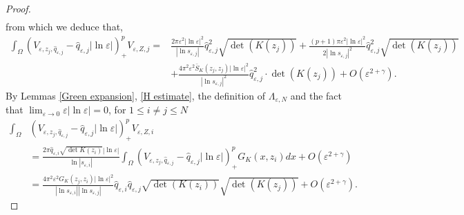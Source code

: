 \documentclass[12pt,reqno]{amsart}
\numberwithin{equation}{section}
\theoremstyle{definition}
\theoremstyle{remark}
\begin{document}
\begin{proof}
\begin{equation*}
\begin{split}
\end{split}
\end{equation*}
from which we deduce that, 
\begin{equation}\label{219}
\begin{split}
\int_{\Omega}\left (V_{\varepsilon,z_j,\hat{q}_{\varepsilon,j}}-\hat{q}_{\varepsilon,j}|\ln\varepsilon|\right )^p_+V_{\varepsilon,Z,j}
=&\frac{2\pi\varepsilon^2|\ln\varepsilon|^2}{|\ln s_{\varepsilon,j}|}\hat{q}_{\varepsilon,j}^2\sqrt{\det(K(z_j))}+\frac{(p+1)\pi\varepsilon^2|\ln\varepsilon|^2}{2 |\ln s_{\varepsilon,j}|^2}\hat{q}_{\varepsilon,j}^2\sqrt{\det(K(z_j))}\\
&+\frac{4\pi^2\varepsilon^2 \bar{S}_K(z_j,z_j)|\ln\varepsilon|^2}{|\ln s_{\varepsilon,j}|^2}\hat{q}_{\varepsilon,j}^2\cdot \det(K(z_j))+O\left( \varepsilon^{2+\gamma} \right).
\end{split}
\end{equation}
By Lemmas \ref{Green expansion}, \ref{H estimate}, the definition of $ \Lambda_{\varepsilon, N} $ and the fact that $ \lim_{\varepsilon\to 0}\varepsilon|\ln\varepsilon|=0 $, for $ 1\leq i\neq j\leq N $
\begin{equation}\label{220}
\begin{split}
\int_{\Omega}&\left (V_{\varepsilon,z_j,\hat{q}_{\varepsilon,j}}-\hat{q}_{\varepsilon,j}|\ln\varepsilon|\right )^p_+V_{\varepsilon,Z,i}\\
&=\frac{2\pi\hat{q}_{\varepsilon,i}\sqrt{\det K(z_i)}|\ln\varepsilon|}{\ln|s_{\varepsilon,i}|}\int_{\Omega}\left (V_{\varepsilon,z_j,\hat{q}_{\varepsilon,j}}-\hat{q}_{\varepsilon,j}|\ln\varepsilon|\right )^p_+G_K(x,z_i)dx+O\left( \varepsilon^{2+\gamma} \right)\\
&=\frac{4\pi^2\varepsilon^2G_K(z_j,z_i)|\ln\varepsilon|^2}{|\ln s_{\varepsilon,i}||\ln s_{\varepsilon,j}|}\hat{q}_{\varepsilon,i}\hat{q}_{\varepsilon,j}\sqrt{\det(K(z_i))}\sqrt{\det(K(z_j))}+O\left( \varepsilon^{2+\gamma} \right).
\end{split}
\end{equation}


\end{proof}
\end{document}
